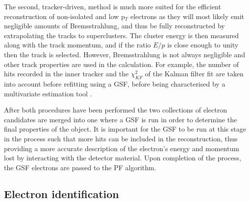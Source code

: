The second, tracker-driven, method is much more suited for the efficient reconstruction of non-isolated and low p$_T$ electrons as they will most likely emit negligible amounts of Bremsstrahlung, and thus be fully reconstructed by extrapolating the tracks to superclusters. The cluster energy is then measured along with the track momentum, and if the ratio $E/p$ is close enough to unity then the track is selected. However, Bremsstrahlung is not always negligible and other track properties are used in the calculation. For example, the number of hits recorded in the inner tracker and the $\chi^2_{KF}$ of the Kalman filter fit are taken into account before refitting using a GSF, before being characterised by a multivariate estimation tool \cite{Roe2005577}. 

After both procedures have been performed the two collections of electron candidates are merged into one where a GSF is run in order to determine the final properties of the object. It is important for the GSF to be run at this stage in the process such that more hits can be included in the reconstruction, thus providing a more accurate description of the electron's energy and momentum lost by interacting with the detector material. Upon completion of the process, the GSF electrons are passed to the PF algorithm.

\subsection{Electron identification} \label{subsec-ElectronIdentification}

